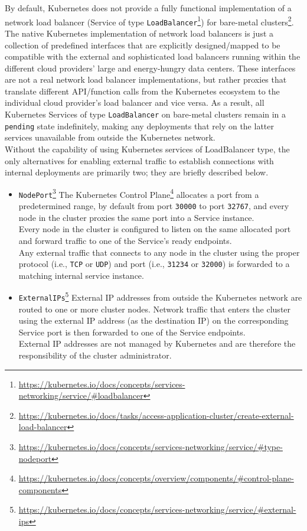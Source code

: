 By default, Kubernetes does not provide a fully functional implementation of a
network load balancer (Service of type \texttt{LoadBalancer}\footnote{\url{https://kubernetes.io/docs/concepts/services-networking/service/\#loadbalancer}})
for bare-metal clusters\footnote{\url{https://kubernetes.io/docs/tasks/access-application-cluster/create-external-load-balancer}}.
The native Kubernetes implementation of network load balancers is just a
collection of predefined interfaces that are explicitly designed/mapped to be
compatible with the external and sophisticated load balancers running within the
different cloud providers' large and energy-hungry data centers. These
interfaces are not a real network load balancer implementations, but rather proxies
that translate different API/function calls from the Kubernetes ecosystem to the
individual cloud provider's load balancer and vice versa. As a result, all Kubernetes
Services of type \texttt{LoadBalancer} on bare-metal clusters remain in a
\texttt{pending} state indefinitely, making any deployments that rely on the
latter services unavailable from outside the Kubernetes network\cite{metallb}.
\\ %
Without the capability of using Kubernetes services of LoadBalancer type, the
only alternatives for enabling external traffic to establish connections with
internal deployments are primarily two; they are briefly described below.
\begin{itemize}
  \item \texttt{NodePort}\footnote{\url{https://kubernetes.io/docs/concepts/services-networking/service/\#type-nodeport}}
    \newline
    The Kubernetes Control Plane\footnote{\url{https://kubernetes.io/docs/concepts/overview/components/\#control-plane-components}}
    allocates a port from a predetermined range, by default from port \texttt{30000}
    to port \texttt{32767}, and every node in the cluster proxies the same port
    into a Service instance. \\ %
    Every node in the cluster is configured to listen on the same allocated port
    and forward traffic to one of the Service's ready endpoints. \\ %
    Any external traffic that connects to any node in the cluster using the
    proper protocol (i.e., \texttt{TCP} or \texttt{UDP}) and port (i.e., \texttt{31234}
    or \texttt{32000}) is forwarded to a matching internal service instance\cite{k8s_service_node_port}.

  \item \texttt{ExternalIPs}\footnote{\url{https://kubernetes.io/docs/concepts/services-networking/service/\#external-ips}}
    \newline
    External IP addresses from outside the Kubernetes network are routed to one
    or more cluster nodes. Network traffic that enters the cluster using the external
    IP address (as the destination IP) on the corresponding Service port is then
    forwarded to one of the Service endpoints. \\ %
    External IP addresses are not managed by Kubernetes and are therefore the responsibility
    of the cluster administrator\cite{k8s_service_external_ips}.
\end{itemize}

